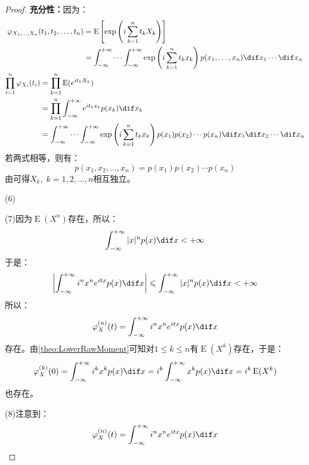 \begin{proof}
	\textbf{充分性：}因为：
	\begin{gather*}
		\begin{aligned}
			\varphi_{X_1,\dots,X_n}(t_1,t_2,\dots,t_n)
			&=\operatorname{E}\left[\exp\left(i\sum_{k=1}^{n}t_kX_k\right)\right] \\
			&=\int_{-\infty}^{+\infty}\cdots\int_{-\infty}^{+\infty}\exp\left(i\sum_{k=1}^{n}t_kx_k\right)p(x_1,\dots,x_n)\dif x_1\cdots\dif x_n
		\end{aligned} \\
		\begin{aligned}
			\prod_{i=1}^n\varphi_{X_i}(t_i)
			&=\prod_{k=1}^n\operatorname{E}(e^{it_kX_k}) \\
			&=\prod_{k=1}^n\int_{-\infty}^{+\infty}e^{it_kx_k}p(x_k)\dif x_k \\
			&=\int_{-\infty}^{+\infty}\cdots\int_{-\infty}^{+\infty}\exp\left(i\sum_{k=1}^{n}t_kx_k\right)p(x_1)p(x_2)\cdots p(x_n)\dif x_1\dif x_2\cdots\dif x_n
		\end{aligned}
	\end{gather*}
	若两式相等，则有：
	\begin{equation*}
		p(x_1,x_2,\dots,x_n)=p(x_1)p(x_2)\cdots p(x_n)
	\end{equation*}
	由可得$X_k,\;k=1,2,\dots,n$相互独立。\par
	(6)\par
	(7)因为$\operatorname{E}(X^n)$存在，所以：
	\begin{equation*}
		\int_{-\infty}^{+\infty}|x|^np(x)\dif x<+\infty
	\end{equation*}
	于是：
	\begin{equation*}
		\left|\int_{-\infty}^{+\infty}i^nx^ne^{itx}p(x)\dif x\right|\leqslant\int_{-\infty}^{+\infty}|x|^np(x)\dif x<+\infty
	\end{equation*}
	所以：
	\begin{equation*}
		\varphi_X^{(n)}(t)=\int_{-\infty}^{+\infty}i^nx^ne^{itx}p(x)\dif x
	\end{equation*}
	存在。由\cref{theo:LowerRawMoment}可知对$1\leqslant k\leqslant n$有$\operatorname{E}(X^k)$存在，于是：
	\begin{equation*}
		\varphi_X^{(k)}(0)=\int_{-\infty}^{+\infty}i^kx^kp(x)\dif x=i^k\int_{-\infty}^{+\infty}x^kp(x)\dif x=i^k\operatorname{E}(X^k)
	\end{equation*}
	也存在。\par
	(8)注意到：
	\begin{equation*}
		\varphi_X^{(n)}(t)=\int_{-\infty}^{+\infty}i^nx^ne^{itx}p(x)\dif x

\end{equation*}
\end{proof}
